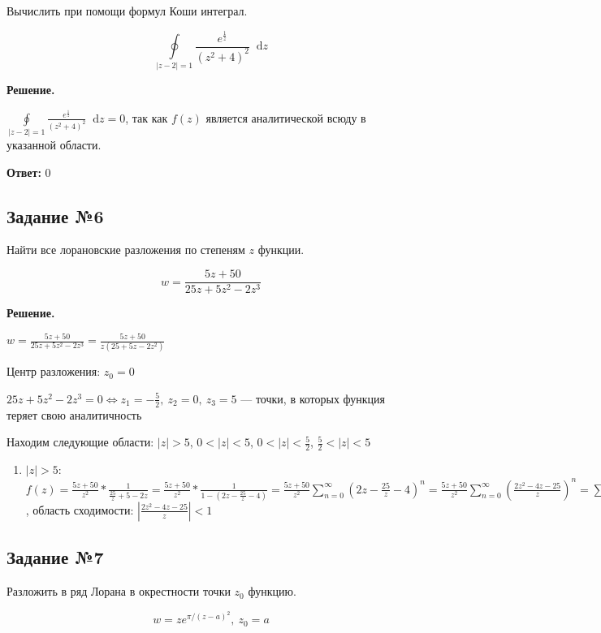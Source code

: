 \documentclass{article}
\newcommand*\diff{\mathop{}\!\mathrm{d}}
\begin{document}
Вычислить при помощи формул Коши интеграл.

$$
\oint\limits_{|z - 2| = 1} \frac{e^{\frac{1}{z}}}{(z^2 + 4)^2} \diff z
$$

\hfill

\textbf{Решение.}

$\oint\limits_{|z - 2| = 1} \frac{e^{\frac{1}{z}}}{(z^2 + 4)^2} \diff z = 0$, так как $f(z)$ является аналитической всюду в указанной области.

\hfill

\textbf{Ответ:} 0

\subsection{Задание №6}

Найти все лорановские разложения по степеням $z$ функции.

$$
w = \frac{5 z + 50}{25 z + 5 z^2 - 2 z^3}
$$

\textbf{Решение.}

$w = \frac{5 z + 50}{25 z + 5 z^2 - 2 z^3} = \frac{5 z + 50}{z (25 + 5z - 2 z^2)}$

Центр разложения: $z_0 = 0$

$25 z + 5 z^2 - 2 z^3 = 0 \Longleftrightarrow z_1 = -\frac{5}{2}, \ z_2 = 0, \ z_3 = 5$ — точки, в которых функция теряет свою аналитичность

Находим следующие области: $|z| > 5$, $0 < |z| < 5$, $0 < |z| < \frac{5}{2}$, $\frac{5}{2} < |z| < 5$

\begin{enumerate}
    \item $|z| > 5$: \\
    $f(z) = \frac{5z + 50}{z^2} * \frac{1}{\frac{25}{z} + 5 - 2z} = \frac{5z + 50}{z^2} * \frac{1}{1 - (2z -\frac{25}{z} - 4)} = \frac{5 z + 50}{z^2} \sum\limits_{n = 0}^{\infty} (2z -\frac{25}{z} - 4)^{n} = \frac{5 z + 50}{z^2} \sum\limits_{n = 0}^{\infty} (\frac{2 z^2 - 4z - 25}{z})^{n} = \sum\limits_{n = 0}^{\infty} \frac{(5 z + 50)(2 z^2 - 4z - 25)^{n}}{z^{n + 2}}$, область сходимости: $|\frac{2 z^2 - 4z - 25}{z}| < 1$
\end{enumerate}
    
\subsection{Задание №7}

Разложить в ряд Лорана в окрестности точки $z_0$ функцию.

$$
w = z e^{\pi / (z - a)^2}, \ z_0 = a
$$
\end{document}
